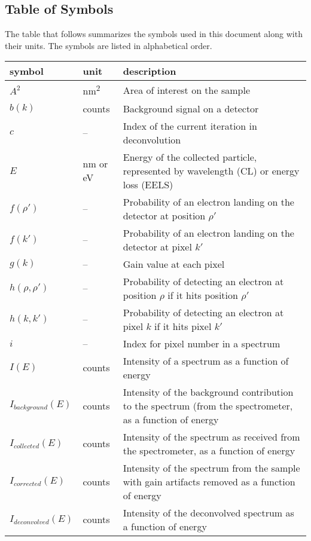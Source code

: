\documentclass[12pt]{article}
\begin{document}
\subsection{Table of Symbols}

The table that follows summarizes the symbols used in this document along with
their units. The symbols are listed in alphabetical order.

\renewcommand{\arraystretch}{1.2}
\noindent \begin{longtable*}{l l p{12cm}} \toprule
\textbf{symbol} & \textbf{unit} & \textbf{description}\\
\midrule 
$A^2$ & \si{\nano\metre^2} & Area of interest on the sample\\
$b(k)$ & counts & Background signal on a detector\\
$c$ & -- & Index of the current iteration in deconvolution \\
$E$ & \si{\nano\metre} or \si{\electronvolt} & Energy of the collected particle, represented by wavelength (CL) or energy loss (EELS)\\
$f(\rho')$ & -- & Probability of an electron landing on the detector at position $\rho'$\\
$f(k')$ & -- & Probability of an electron landing on the detector at pixel $k'$\\
$g(k)$ & -- & Gain value at each pixel\\
$h(\rho, \rho')$ & -- & Probability of detecting an electron at position $\rho$ if it hits position $\rho'$\\
$h(k, k')$ & -- & Probability of detecting an electron at pixel $k$ if it hits pixel $k'$\\
$i$ & -- & Index for pixel number in a spectrum\\
$I(E)$ & counts & Intensity of a spectrum as a function of energy\\
$I_{background}(E)$ & counts & Intensity of the background contribution to the spectrum (from the spectrometer, as a function of energy\\
$I_{collected}(E)$ & counts & Intensity of the spectrum as received from the spectrometer, as a function of energy\\
$I_{corrected}(E)$ & counts & Intensity of the spectrum from the sample with gain artifacts removed as a function of energy\\
$I_{deconvolved}(E)$ & counts & Intensity of the deconvolved spectrum as a function of energy\\

\end{longtable*}
\end{document}
